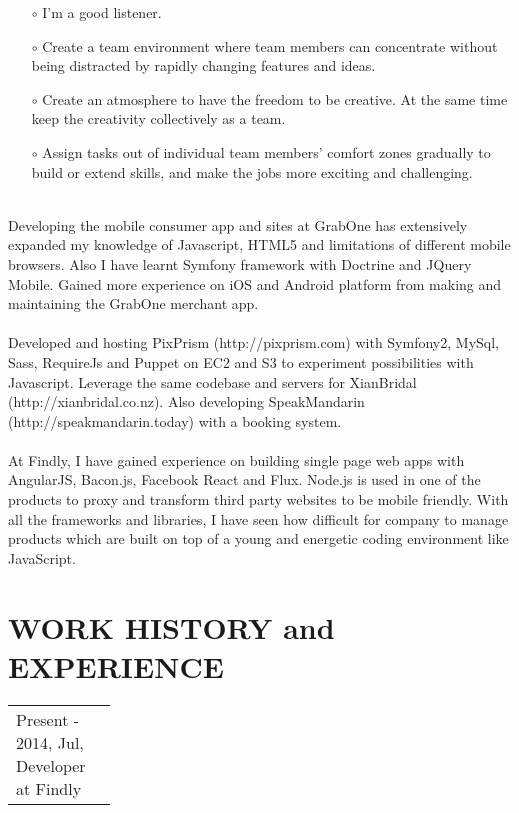 \begin{resume}
\begin{itemize}
\item[$\circ$] I'm a good listener.
\item[$\circ$] Create a team environment where team members can concentrate without being distracted by rapidly changing features and ideas.
\item[$\circ$] Create an atmosphere to have the freedom to be creative. At the same time keep the creativity collectively as a team.
\item[$\circ$] Assign tasks out of individual team members' comfort zones gradually to build or extend skills, and make the jobs more exciting and challenging.\\\\
\end{itemize} 
Developing the mobile consumer app and sites at GrabOne has extensively expanded my knowledge of Javascript, HTML5 and limitations of different mobile browsers. Also I have learnt Symfony framework with Doctrine and JQuery Mobile. Gained more experience on iOS and Android platform from making and maintaining the GrabOne merchant app.\\\\
Developed and hosting PixPrism (http://pixprism.com) with Symfony2, MySql, Sass, RequireJs and Puppet on EC2 and S3 to experiment possibilities with Javascript. Leverage the same codebase and servers for XianBridal (http://xianbridal.co.nz). Also developing SpeakMandarin\\(http://speakmandarin.today) with a booking system.\\\\
At Findly, I have gained experience on building single page web apps with AngularJS, Bacon.js, Facebook React and Flux. Node.js is used in one of the products to proxy and transform third party websites to be mobile friendly. With all the frameworks and libraries, I have seen how difficult for company to manage products which are built on top of a young and energetic coding environment like JavaScript. 

\section{WORK HISTORY and EXPERIENCE} 
\vspace{0.15in} 

\begin{tabular}{ll}
\parbox[t]{35mm}{Present - \\ 2014, Jul,\\Developer\\at Findly} & \parbox[t]{111mm}{

}
\end{tabular}
\end{resume}
